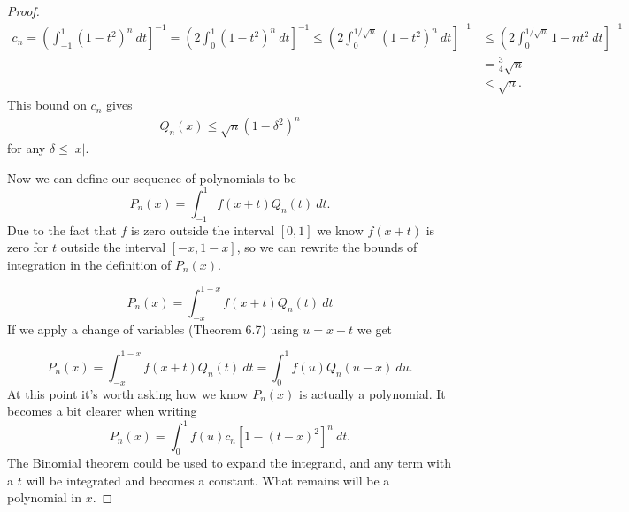 \documentclass{article}
\theoremstyle{definition}
\begin{document}
\begin{proof}
		\begin{align*}
			c_n=\left(\int_{-1}^{1} (1-t^2)^n\ dt\right]^{-1}=\left(2\int_{0}^{1} (1-t^2)^n\ dt\right]^{-1}\le\left(2\int_{0}^{1/\sqrt{n}} (1-t^2)^n \ dt\right]^{-1}&\le\left(2\int_{0}^{1/\sqrt{n}} 1-nt^2 \ dt\right]^{-1}\\&=\frac{3}{4}\sqrt{n}\\&<\sqrt{n}.
		\end{align*}
		This bound on $ c_n $ gives 
		\begin{align}
			Q_n(x)\le \sqrt{n}(1-\delta^2)^n
		\end{align}
		for any $ \delta\le |x| $. 
		
		Now we can define our sequence of polynomials to be $$ P_n(x)=\int_{-1}^{1}f(x+t)Q_n(t)\ dt. $$ Due to the fact that $ f $ is zero outside the interval $ [0,1] $ we know $ f(x+t) $ is zero for $ t $ outside the interval $ [-x,1-x] $, so we can rewrite the bounds of integration in the definition of $ P_n(x) $.  
		
		$$ P_n(x)=\int_{-x}^{1-x}f(x+t)Q_n(t)\ dt$$
		If we apply a change of variables (Theorem 6.7) using $ u=x+t $ we get 
		
		$$ P_n(x)=\int_{-x}^{1-x}f(x+t)Q_n(t)\ dt= \int_{0}^{1}f(u)Q_n(u-x)\ du.$$ At this point it's worth asking how we know $ P_n(x) $ is actually a polynomial. It becomes a bit clearer when writing $$ P_n(x)=\int_{0}^1f(u)c_n[1-(t-x)^2]^n\ dt.$$ The Binomial theorem could be used to expand the integrand, and any term with a $ t $ will be integrated and becomes a constant. What remains will be a polynomial in $ x $.  
		

\end{proof}
\end{document}
